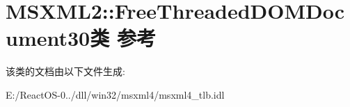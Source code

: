 \hypertarget{class_m_s_x_m_l2_1_1_free_threaded_d_o_m_document30}{}\section{M\+S\+X\+M\+L2\+:\+:Free\+Threaded\+D\+O\+M\+Document30类 参考}
\label{class_m_s_x_m_l2_1_1_free_threaded_d_o_m_document30}


该类的文档由以下文件生成\+:\begin{DoxyCompactItemize}
\item 
E\+:/\+React\+O\+S-\/0../dll/win32/msxml4/msxml4\+\_\+tlb.\+idl\end{DoxyCompactItemize}
